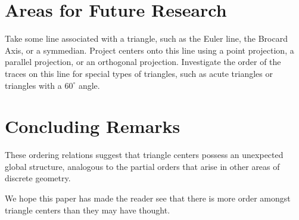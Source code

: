 \documentclass[12pt,a4paper]{amsart}
\newcommand{\degrees}{^\circ}
\begin{document}
\section{Areas for Future Research}

Take some line associated with a triangle, such as the Euler line, the Brocard Axis, or a symmedian.
Project centers onto this line using a point projection, a parallel projection, or an orthogonal projection.
Investigate the order of the traces on this line for special types of triangles, such as acute triangles
or triangles with a $60\degrees$ angle.

\section{Concluding Remarks}

These ordering relations suggest that triangle centers possess an unexpected global structure, analogous to the partial orders that arise in other areas of discrete geometry.

We hope this paper has made the reader see that there is more order amongst triangle centers
than they may have thought.

\end{document}
